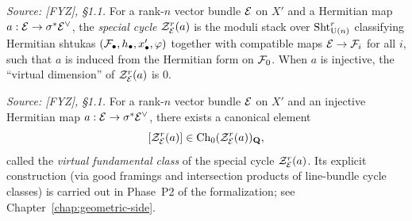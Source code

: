 \begin{definition}
  \label{def:special-cycle}
  \textit{Source: [FYZ], \S1.1.}
  For a rank-\(n\) vector bundle \(\mathcal{E}\) on \(X'\) and a Hermitian map
  \(a : \mathcal{E} \to \sigma^* \mathcal{E}^\vee\), the \emph{special cycle}
  \(\mathcal{Z}_{\mathcal{E}}^r(a)\) is the moduli stack over \(\operatorname{Sht}_{\operatorname{U}(n)}^r\) classifying
  Hermitian shtukas \((\mathcal{F}_\bullet, h_\bullet, x'_\bullet, \varphi)\) together with
  compatible maps \(\mathcal{E} \to \mathcal{F}_i\) for all \(i\), such that \(a\) is induced from
  the Hermitian form on \(\mathcal{F}_0\). When \(a\) is injective, the ``virtual dimension''
  of \(\mathcal{Z}_{\mathcal{E}}^r(a)\) is \(0\).
\end{definition}

\begin{definition}
  \label{def:virtual-fundamental-class}
  \textit{Source: [FYZ], \S1.1.}
  For a rank-\(n\) vector bundle \(\mathcal{E}\) on \(X'\) and an injective Hermitian map
  \(a : \mathcal{E} \to \sigma^* \mathcal{E}^\vee\), there exists a canonical element
  \[
    [\mathcal{Z}_{\mathcal{E}}^r(a)] \in \operatorname{Ch}_0(\mathcal{Z}_{\mathcal{E}}^r(a))_{\mathbf{Q}},
  \]
  called the \emph{virtual fundamental class} of the special cycle
  \(\mathcal{Z}_{\mathcal{E}}^r(a)\). Its explicit construction (via good framings and intersection
  products of line-bundle cycle classes) is carried out in Phase~P2 of the
  formalization; see Chapter~\ref{chap:geometric-side}.
\end{definition}

